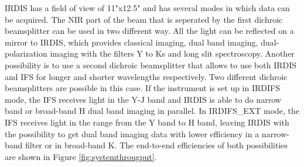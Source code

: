 \documentclass[twoside,single,12pt]{lion-msc}
\begin{document}
IRDIS has a field of view of 11"x12.5" and has several modes in which data can be acquired. The NIR part of the beam that is seperated by the first dichroic beamsplitter can be used in two different way. All the light can be reflected on a mirror to IRDIS, which provides classical imaging, dual band imaging, dual-polarization imaging with the filters Y to Ks and long slit spectroscopy. Another possibility is to use a second dichroic beamsplitter that allows to use both IRDIS and IFS for longer and shorter wavelengths respectively. Two different dichroic beamsplitters are possible in this case. If the instrument is set up in IRDIFS mode, the IFS receives light in the Y-J band and IRDIS is able to do narrow band or broad-band H dual band imaging in parallel. In IRDIFS\_EXT mode, the IFS receives light in the range from the Y band to H band, leaving IRDIS with the possibility to get dual band imaging data with lower efficiency in a narrow-band filter or in broad-band K. The end-to-end efficiencies of both possibilities are shown in Figure \ref{fig:systemthrougput}. 
\end{document}
